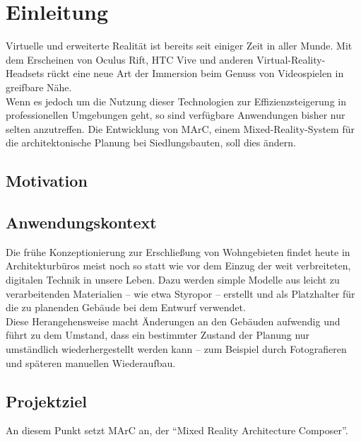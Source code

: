 \section{Einleitung}\label{sec:Einleitung}
Virtuelle und erweiterte Realität ist bereits seit einiger Zeit in aller Munde. Mit dem Erscheinen von Oculus Rift, HTC Vive und anderen Virtual-Reality-Headsets rückt eine neue Art der Immersion beim Genuss von Videospielen in greifbare Nähe.\\
Wenn es jedoch um die Nutzung dieser Technologien zur Effizienzsteigerung in professionellen Umgebungen geht, so sind verfügbare Anwendungen bisher nur selten anzutreffen.
Die Entwicklung von MArC, einem Mixed-Reality-System für die architektonische Planung bei Siedlungsbauten, soll dies ändern.

\subsection{Motivation}\label{sec:Motivation}

\subsection{Anwendungskontext}\label{sec:Anwendungskontext} 
Die frühe Konzeptionierung zur Erschließung von Wohngebieten findet heute in Architekturbüros meist noch so statt wie vor dem Einzug der weit verbreiteten, digitalen Technik in unsere Leben. Dazu werden simple Modelle aus leicht zu verarbeitenden Materialien -- wie etwa Styropor -- erstellt und als Platzhalter für die zu planenden Gebäude bei dem Entwurf verwendet.\\
Diese Herangehensweise macht Änderungen an den Gebäuden aufwendig und führt zu dem Umstand, dass ein bestimmter Zustand der Planung nur umständlich wiederhergestellt werden kann -- zum Beispiel durch Fotografieren und späteren manuellen Wiederaufbau.

\subsection{Projektziel}\label{sec:Projektziel}
An diesem Punkt setzt MArC an, der "`Mixed Reality Architecture Composer"'. 
